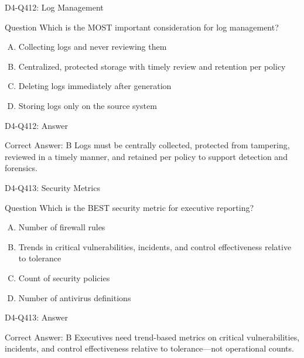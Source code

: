 \documentclass{beamer}
\begin{document}
\begin{frame}{D4-Q412: Log Management}
	\begin{block}{Question}
		Which is the MOST important consideration for log management?
	\end{block}
	\begin{enumerate}[(A)]
		\item Collecting logs and never reviewing them
		\item Centralized, protected storage with timely review and retention per policy
		\item Deleting logs immediately after generation
		\item Storing logs only on the source system
	\end{enumerate}
\end{frame}
\begin{frame}{D4-Q412: Answer}
	\begin{block}{Correct Answer: B}
		Logs must be centrally collected, protected from tampering, reviewed in a timely manner, and retained per policy to support detection and forensics.
	\end{block}
\end{frame}

\begin{frame}{D4-Q413: Security Metrics}
	\begin{block}{Question}
		Which is the BEST security metric for executive reporting?
	\end{block}
	\begin{enumerate}[(A)]
		\item Number of firewall rules
		\item Trends in critical vulnerabilities, incidents, and control effectiveness relative to tolerance
		\item Count of security policies
		\item Number of antivirus definitions
	\end{enumerate}
\end{frame}
\begin{frame}{D4-Q413: Answer}
	\begin{block}{Correct Answer: B}
		Executives need trend-based metrics on critical vulnerabilities, incidents, and control effectiveness relative to tolerance—not operational counts.
	\end{block}
\end{frame}
\end{document}
